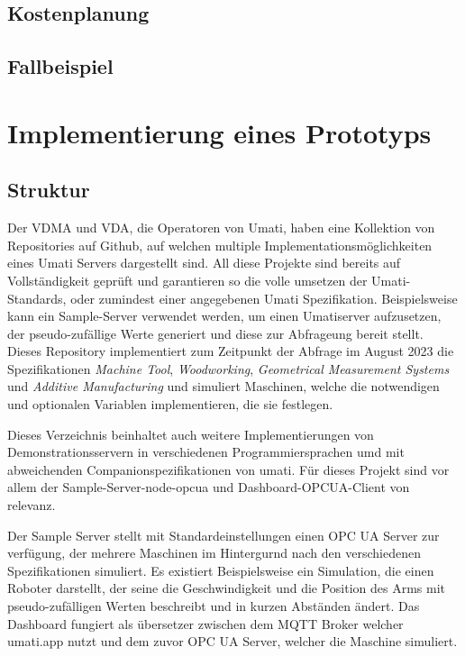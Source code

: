 \documentclass[a4paper, 12pt, oneside]{scrbook}
\begin{document}
		\subsection{Kostenplanung}
		
		\subsection{Fallbeispiel}
	
	\section{Implementierung eines Prototyps}
	
		\subsection{Struktur}
		
		Der VDMA und VDA, die Operatoren von Umati, haben eine Kollektion von Repositories auf Github, auf welchen multiple Implementationsmöglichkeiten eines Umati Servers dargestellt sind. \cite{noauthor_github_nodate} All diese Projekte sind bereits auf Vollständigkeit geprüft und garantieren so die volle umsetzen der Umati-Standards, oder zumindest einer angegebenen Umati Spezifikation. Beispielsweise kann ein Sample-Server verwendet werden, um einen Umatiserver aufzusetzen, der pseudo-zufällige Werte generiert und diese zur Abfrageung bereit stellt. Dieses Repository implementiert zum Zeitpunkt der Abfrage im August 2023 die Spezifikationen \textit{Machine Tool}, \textit{Woodworking}, \textit{Geometrical Measurement Systems} und \textit{Additive Manufacturing} und simuliert Maschinen, welche die notwendigen und optionalen Variablen implementieren, die sie festlegen.
		
		Dieses Verzeichnis beinhaltet auch weitere Implementierungen von Demonstrationsservern in verschiedenen Programmiersprachen umd mit abweichenden Companionspezifikationen von umati. Für dieses Projekt sind vor allem der Sample-Server-node-opcua und Dashboard-OPCUA-Client von relevanz. 
		
		Der Sample Server stellt mit Standardeinstellungen einen OPC UA Server zur verfügung, der mehrere Maschinen im Hintergurnd nach den verschiedenen Spezifikationen simuliert. Es existiert Beispielsweise ein Simulation, die einen Roboter darstellt, der seine die Geschwindigkeit und die Position des Arms mit pseudo-zufälligen Werten beschreibt und in kurzen Abständen ändert. Das Dashboard fungiert als übersetzer zwischen dem MQTT Broker welcher umati.app nutzt und dem zuvor OPC UA Server, welcher die Maschine simuliert.
		
\end{document}
